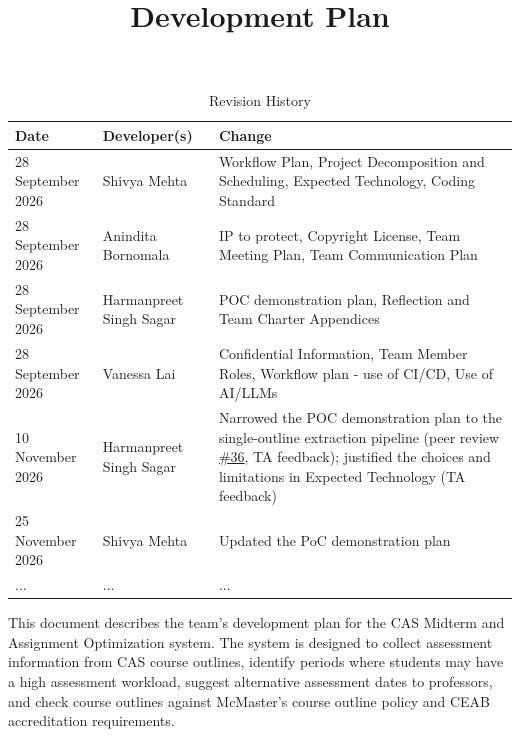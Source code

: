 \documentclass{article}
\title{Development Plan\\\progname}
\author{\authname}
\date{}
\begin{document}
\maketitle

\begin{table}[hp]
\caption{Revision History} \label{TblRevisionHistory}
\begin{tabularx}{\textwidth}{llX}
\toprule
\textbf{Date} & \textbf{Developer(s)} & \textbf{Change}\\
\midrule
28 September 2026 & Shivya Mehta & Workflow Plan, Project Decomposition and
Scheduling, Expected Technology, Coding Standard\\
28 September 2026 & Anindita Bornomala & IP to protect, Copyright License, Team
Meeting Plan, Team Communication Plan \\
28 September 2026 & Harmanpreet Singh Sagar & POC demonstration plan, Reflection
and Team Charter Appendices\\
28 September 2026 & Vanessa Lai & Confidential Information, Team Member
Roles, Workflow plan - use of CI/CD, Use of AI/LLMs\\
10 November 2026 & Harmanpreet Singh Sagar & Narrowed the POC
demonstration plan to the single-outline extraction pipeline (peer review
\href{https://github.com/shivyam/cas-course-optimization/issues/36}{\#36}, TA feedback); justified the choices and limitations in Expected
Technology (TA feedback)\\
25 November 2026 & Shivya Mehta & Updated the PoC demonstration plan \\
... & ... & ...\\
\bottomrule
\end{tabularx}
\end{table}

\newpage{}



This document describes the team's development plan for the CAS Midterm and
Assignment Optimization system. The system is designed to collect assessment
information from CAS course outlines, identify periods where students may have a
high assessment workload, suggest alternative assessment dates to professors,
and check course outlines against McMaster's course outline policy and CEAB
accreditation requirements.
\end{document}
